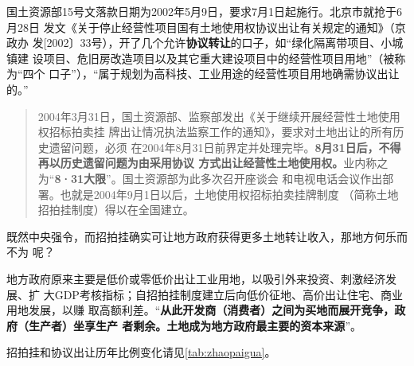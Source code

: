 国土资源部15号文落款日期为2002年5月9日，要求7月1日起施行。北京市就抢于6月28日
发文《关于停止经营性项目国有土地使用权协议出让有关规定的通知》（京政办
发[2002〕33号），开了几个允许\textbf{协议转让}的口子，如“绿化隔离带项目、小城镇建
设项目、危旧房改造项目以及其它重大建设项目中的经营性项目用地”（被称为“四个
口子”），“属于规划为高科技、工业用途的经营性项目用地确需协议出让的。”

\begin{quotation}
2004年3月31日，国土资源部、监察部发出《关于继续开展经营性土地使用权招标拍卖挂
牌出让情况执法监察工作的通知》，要求对土地出让的所有历史遗留问题，必须
在2004年8月31日前界定并处理完毕。\textbf{8月31日后，不得再以历史遗留问题为由采用协议
方式出让经营性土地使用权。}业内称之为“\textbf{8·31大限}”。国土资源部为此多次召开座谈会
和电视电话会议作出部署。也就是2004年9月1日以后，土地使用权招标拍卖挂牌制度
（简称土地招拍挂制度）得以在全国建立。
\end{quotation}

既然中央强令，而招拍挂确实可让地方政府获得更多土地转让收入，那地方何乐而不为
呢？

地方政府原来主要是低价或零低价出让工业用地，以吸引外来投资、刺激经济发展、扩
大GDP考核指标；自招拍挂制度建立后向低价征地、高价出让住宅、商业用地发展，以赚
取高额利差。“\textbf{从此开发商（消费者）之间为买地而展开竞争，政府（生产者）坐享生产
者剩余。土地成为地方政府最主要的资本来源}”\cite{dajueqi}。

招拍挂和协议出让历年比例变化请见\cref{tab:zhaopaigua}。
\begin{table}[]
\centering
\StartDefiningTabulars
{}
\StopDefiningTabulars
\caption{不同土地出让方式出让土地面积、收入的构成}
\label{tab:zhaopaigua}
\end{table}

